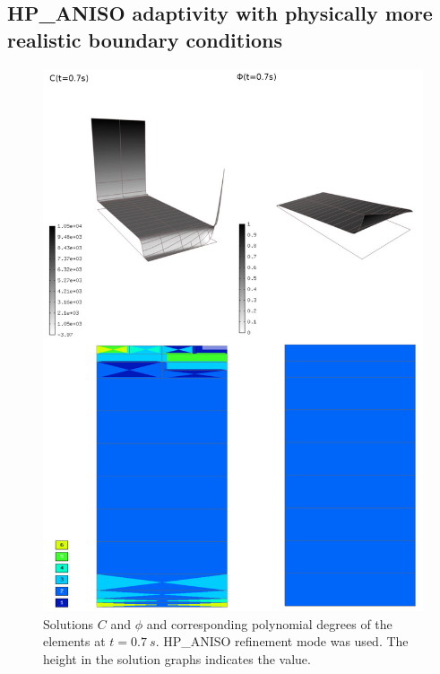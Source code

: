 \subsection{HP\_ANISO adaptivity with physically more realistic boundary conditions}
\begin{figure}[!ht]
  \begin{centering}
  \includegraphics[width=\columnwidth]{cphiorders}
  \caption{\label{fig:cphi-orders} Solutions $C$ and $\phi$
  and corresponding polynomial degrees of the elements at
  $t=0.7\ s$. HP\_ANISO refinement mode was used. The height
  in the solution graphs indicates the value.}
  \end{centering}
\end{figure}

